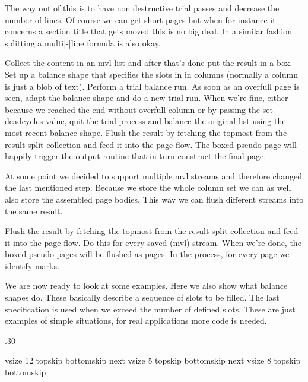 The way out of this is to have non destructive trial passes and decrease the
number of lines. Of course we can get short pages but when for instance it
concerns a section title that gets moved this is no big deal. In a similar
fashion splitting a multi|-|line formula is also okay.

\startitemize
\startitem
    Collect the content in an mvl list and after that's done put the result in a
    box.
\stopitem
\startitem
    Set up a balance shape that specifies the slots in in columns (normally a
    column is just a blob of text).
\stopitem
\startitem
    Perform a trial balance run. As soon as an overfull page is seen, adapt the
    balance shape and do a new trial run.
\stopitem
\startitem
    When we're fine, either because we reached the end without overfull column or
    by passing the set deadcycles value, quit the trial process and balance the
    original list using the most recent balance shape.
\stopitem
\startitem
    Flush the result by fetching the topmost from the result split collection and
    feed it into the page flow. The boxed pseudo page will happily trigger the
    output routine that in turn construct the final page.
\stopitem
\stopitemize

At some point we decided to support multiple mvl streams and therefore changed
the last mentioned step. Because we store the whole column set we can as well
also store the assembled page bodies. This way we can flush different streams into
the same result.

\startitemize
\startitem
    Flush the result by fetching the topmost from the result split collection and
    feed it into the page flow. Do this for every saved (mvl) stream.
\stopitem
\startitem
    When we're done, the boxed pseudo pages will be flushed as pages. In the
    process, for every page we identify marks.
\stopitem
\stopitemize

We are now ready to look at some examples. Here we also show what balance shapes
do. These basically describe a sequence of slots to be filled. The last
specification is used when we exceed the number of defined slots. These are just
examples of simple situations, for real applications more code is needed.

\startbuffer[one]
\setbox\scratchboxone\vbox\bgroup
    \hsize.30\hsize
\egroup
\stopbuffer

\startbuffer[two]
    vsize      12\lineheight
    topskip    \strutht
    bottomskip \strutdp
next
    vsize       5\lineheight
    topskip    \strutht
    bottomskip \strutdp
next
    vsize      8\lineheight
    topskip    \strutht
    bottomskip \strutdp
\relax
\stopbuffer

